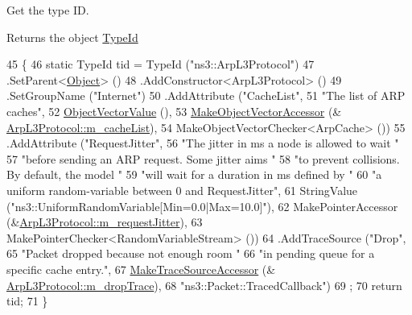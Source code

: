 Get the type ID. 

\begin{DoxyReturn}{Returns}
the object \hyperlink{classns3_1_1TypeId}{Type\+Id} 
\end{DoxyReturn}

\begin{DoxyCode}
45 \{
46   \textcolor{keyword}{static} TypeId tid = TypeId (\textcolor{stringliteral}{"ns3::ArpL3Protocol"})
47     .SetParent<\hyperlink{classns3_1_1Object_a40860402e64d8008fb42329df7097cdb}{Object}> ()
48     .AddConstructor<ArpL3Protocol> ()
49     .SetGroupName (\textcolor{stringliteral}{"Internet"})
50     .AddAttribute (\textcolor{stringliteral}{"CacheList"},
51                    \textcolor{stringliteral}{"The list of ARP caches"},
52                    \hyperlink{namespacens3_a5de726d8bcea7a51fd68ce5167a66713}{ObjectVectorValue} (),
53                    \hyperlink{namespacens3_a6ad5b3621a5dc72b7030cbb07c73adf6}{MakeObjectVectorAccessor} (&
      \hyperlink{classns3_1_1ArpL3Protocol_a369682dd4e6568e6e5731d61147596c7}{ArpL3Protocol::m\_cacheList}),
54                    MakeObjectVectorChecker<ArpCache> ())
55     .AddAttribute (\textcolor{stringliteral}{"RequestJitter"},
56                    \textcolor{stringliteral}{"The jitter in ms a node is allowed to wait "}
57                    \textcolor{stringliteral}{"before sending an ARP request.  Some jitter aims "}
58                    \textcolor{stringliteral}{"to prevent collisions. By default, the model "}
59                    \textcolor{stringliteral}{"will wait for a duration in ms defined by "}
60                    \textcolor{stringliteral}{"a uniform random-variable between 0 and RequestJitter"},
61                    StringValue (\textcolor{stringliteral}{"ns3::UniformRandomVariable[Min=0.0|Max=10.0]"}),
62                    MakePointerAccessor (&\hyperlink{classns3_1_1ArpL3Protocol_a0d5144a236473eb6d7153600fdd7c5ee}{ArpL3Protocol::m\_requestJitter}),
63                    MakePointerChecker<RandomVariableStream> ())
64     .AddTraceSource (\textcolor{stringliteral}{"Drop"},
65                      \textcolor{stringliteral}{"Packet dropped because not enough room "}
66                      \textcolor{stringliteral}{"in pending queue for a specific cache entry."},
67                      \hyperlink{group__tracing_gab21a770b9855af4e8f69f7531ea4a6b0}{MakeTraceSourceAccessor} (&
      \hyperlink{classns3_1_1ArpL3Protocol_ac719ebd2b108a4d342741706669d74ad}{ArpL3Protocol::m\_dropTrace}),
68                      \textcolor{stringliteral}{"ns3::Packet::TracedCallback"})
69   ;
70   \textcolor{keywordflow}{return} tid;
71 \}
\end{DoxyCode}


